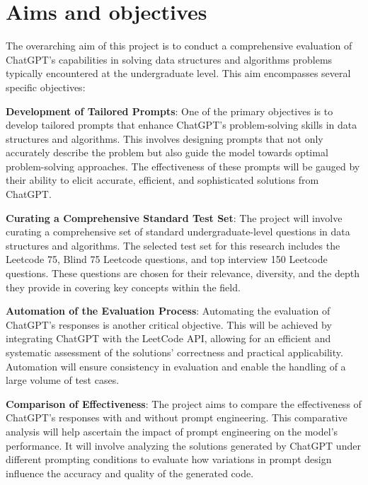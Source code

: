 \section{Aims and objectives}
\label{sec:intro_aims_obj}


The overarching aim of this project is to conduct a comprehensive evaluation of ChatGPT's capabilities in solving data structures and algorithms problems typically encountered at the undergraduate level. This aim encompasses several specific objectives:

\textbf{Development of Tailored Prompts}: One of the primary objectives is to develop tailored prompts that enhance ChatGPT’s problem-solving skills in data structures and algorithms. This involves designing prompts that not only accurately describe the problem but also guide the model towards optimal problem-solving approaches. The effectiveness of these prompts will be gauged by their ability to elicit accurate, efficient, and sophisticated solutions from ChatGPT.

\textbf{Curating a Comprehensive Standard Test Set}: The project will involve curating a comprehensive set of standard undergraduate-level questions in data structures and algorithms. The selected test set for this research includes the Leetcode 75, Blind 75 Leetcode questions, and top interview 150 Leetcode questions. These questions are chosen for their relevance, diversity, and the depth they provide in covering key concepts within the field.

\textbf{Automation of the Evaluation Process}: Automating the evaluation of ChatGPT’s responses is another critical objective. This will be achieved by integrating ChatGPT with the LeetCode API, allowing for an efficient and systematic assessment of the solutions' correctness and practical applicability. Automation will ensure consistency in evaluation and enable the handling of a large volume of test cases.

\textbf{Comparison of Effectiveness}: The project aims to compare the effectiveness of ChatGPT's responses with and without prompt engineering. This comparative analysis will help ascertain the impact of prompt engineering on the model's performance. It will involve analyzing the solutions generated by ChatGPT under different prompting conditions to evaluate how variations in prompt design influence the accuracy and quality of the generated code.

